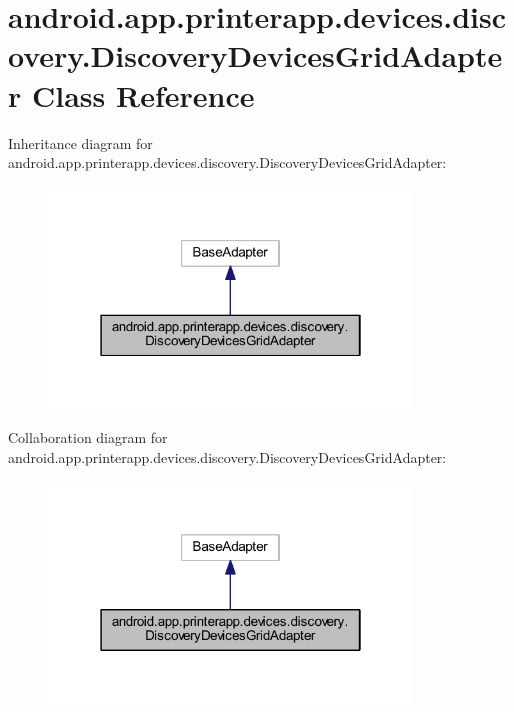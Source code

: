 \hypertarget{classandroid_1_1app_1_1printerapp_1_1devices_1_1discovery_1_1_discovery_devices_grid_adapter}{}\section{android.\+app.\+printerapp.\+devices.\+discovery.\+Discovery\+Devices\+Grid\+Adapter Class Reference}
\label{classandroid_1_1app_1_1printerapp_1_1devices_1_1discovery_1_1_discovery_devices_grid_adapter}


Inheritance diagram for android.\+app.\+printerapp.\+devices.\+discovery.\+Discovery\+Devices\+Grid\+Adapter\+:
\nopagebreak
\begin{figure}[H]
\begin{center}
\leavevmode
\includegraphics[width=274pt]{classandroid_1_1app_1_1printerapp_1_1devices_1_1discovery_1_1_discovery_devices_grid_adapter__inherit__graph}
\end{center}
\end{figure}


Collaboration diagram for android.\+app.\+printerapp.\+devices.\+discovery.\+Discovery\+Devices\+Grid\+Adapter\+:
\nopagebreak
\begin{figure}[H]
\begin{center}
\leavevmode
\includegraphics[width=274pt]{classandroid_1_1app_1_1printerapp_1_1devices_1_1discovery_1_1_discovery_devices_grid_adapter__coll__graph}
\end{center}
\end{figure}
